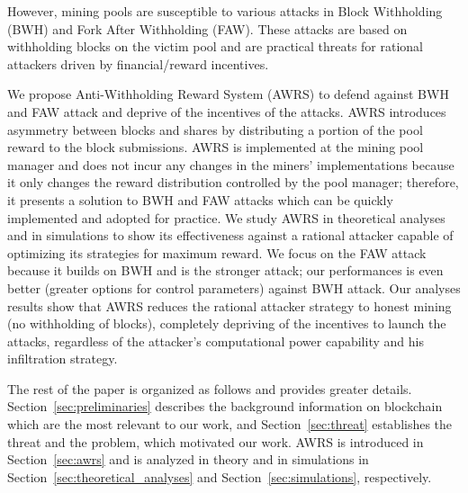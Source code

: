 However, mining pools are susceptible to various attacks %
in Block Withholding (BWH) and Fork After Withholding (FAW).
These attacks are based on withholding blocks on the victim pool and are practical threats for rational attackers driven by financial/reward incentives. %

We propose Anti-Withholding Reward System (AWRS) to defend against BWH and FAW attack and deprive of the incentives of the attacks.
AWRS introduces asymmetry between blocks and shares by distributing a portion of the pool reward to the block submissions.
AWRS is implemented at the mining pool manager and does not incur any changes in the miners' implementations because it only changes the reward distribution controlled by the pool manager;
therefore, it presents a solution to BWH and FAW attacks which can be quickly implemented and adopted for practice.
We study AWRS in theoretical analyses and in simulations to show its effectiveness
against a rational attacker capable of optimizing its strategies for maximum reward.
We focus on the FAW attack because it builds on BWH and is the stronger attack;
our performances is even better (greater options for control parameters) against BWH attack. 
Our analyses results show that AWRS reduces the rational attacker strategy to honest mining (no withholding of blocks), completely depriving of the incentives to launch the attacks, regardless of the attacker's computational power capability and his infiltration strategy.

The rest of the paper is organized as follows and provides greater details.
Section~\ref{sec:preliminaries} describes the background information on blockchain which are the most relevant to our work,
and Section~\ref{sec:threat} establishes the threat and the problem, which motivated our work.
AWRS is introduced in Section~\ref{sec:awrs} and is analyzed in theory and in simulations in Section~\ref{sec:theoretical_analyses} and Section~\ref{sec:simulations}, respectively. %